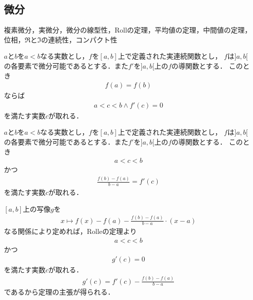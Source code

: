 \subsection{微分}
	複素微分，実微分，微分の線型性，Rollの定理，平均値の定理，中間値の定理，
	位相，$\Re$と$\Im$の連続性，コンパクト性
	
	\begin{screen}
		\begin{thm}[Rolleの定理]\label{Rolle_theorem}
			$a$と$b$を$a<b$なる実数とし，$f$を$[a,b]$上で定義された実連続関数とし，
			$f$は$]a,b[$の各要素で微分可能であるとする．また$f'$を$]a,b[$上の$f$の導関数とする．
			このとき
			\begin{align}
				f(a) = f(b)
			\end{align}
			ならば
			\begin{align}
				a < c < b \wedge f'(c) = 0
			\end{align}
			を満たす実数$c$が取れる．
		\end{thm}
	\end{screen}
	
	\begin{screen}
		\begin{thm}[平均値の定理]
		\label{mean_value_theorem_for_real_valued_differentiable_functions}
			$a$と$b$を$a<b$なる実数とし，$f$を$[a,b]$上で定義された実連続関数とし，
			$f$は$]a,b[$の各要素で微分可能であるとする．また$f'$を$]a,b[$上の$f$の導関数とする．
			このとき
			\begin{align}
				a < c < b
			\end{align}
			かつ
			\begin{align}
				\frac{f(b) - f(a)}{b - a} = f'(c)
			\end{align}
			を満たす実数$c$が取れる．
		\end{thm}
	\end{screen}
	
	\begin{sketch}
		$[a,b]$上の写像$g$を
		\begin{align}
			x \longmapsto f(x) - f(a) - \frac{f(b) - f(a)}{b - a} \cdot (x - a)
		\end{align}
		なる関係により定めれば，Rolleの定理より
		\begin{align}
			a < c < b
		\end{align}
		かつ
		\begin{align}
			g'(c) = 0
		\end{align}
		を満たす実数$c$が取れる．
		\begin{align}
			g'(c) = f'(c) - \frac{f(b) - f(a)}{b - a}
		\end{align}
		であるから定理の主張が得られる．
		\QED
	\end{sketch}
	
